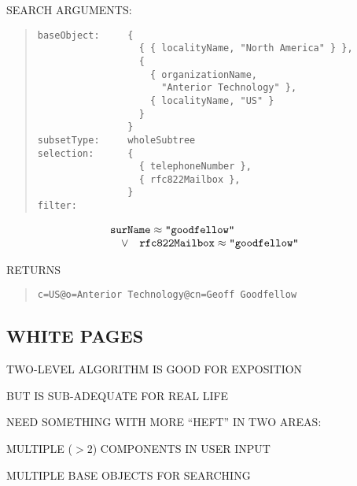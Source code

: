 \begin{bwslide}

\begin{nrtc}
\item	SEARCH ARGUMENTS:
\begin{quote}\small\begin{verbatim}
baseObject:     {
                  { { localityName, "North America" } },
                  {
                    { organizationName,
                      "Anterior Technology" },
                    { localityName, "US" }
                  }
                }
subsetType:     wholeSubtree
selection:      {
                  { telephoneNumber },
                  { rfc822Mailbox },
                }
filter:
\end{verbatim}\end{quote}
\[\begin{array}{lll}
\multicolumn{3}{l}{\mbox{\tt surName}\approx\mbox{\tt "goodfellow"}}\\
&	\lor&	\mbox{\tt rfc822Mailbox}\approx\mbox{\tt "goodfellow"}
\end{array}\]

\item	RETURNS
\begin{quote}\small\begin{verbatim}
c=US@o=Anterior Technology@cn=Geoff Goodfellow
\end{verbatim}\end{quote}
\end{nrtc}
\end{bwslide}


\begin{bwslide}
\part*	{WHITE PAGES}\bf

\begin{nrtc}
\item	TWO-LEVEL ALGORITHM IS GOOD FOR EXPOSITION
    \begin{nrtc}
    \item	BUT IS SUB-ADEQUATE FOR REAL LIFE
    \end{nrtc}

\item	NEED SOMETHING WITH MORE ``HEFT'' IN TWO AREAS:
    \begin{nrtc}
    \item	MULTIPLE ($>2$) COMPONENTS IN USER INPUT

    \item	MULTIPLE BASE OBJECTS FOR SEARCHING
    \end{nrtc}
\end{nrtc}
\end{bwslide}



